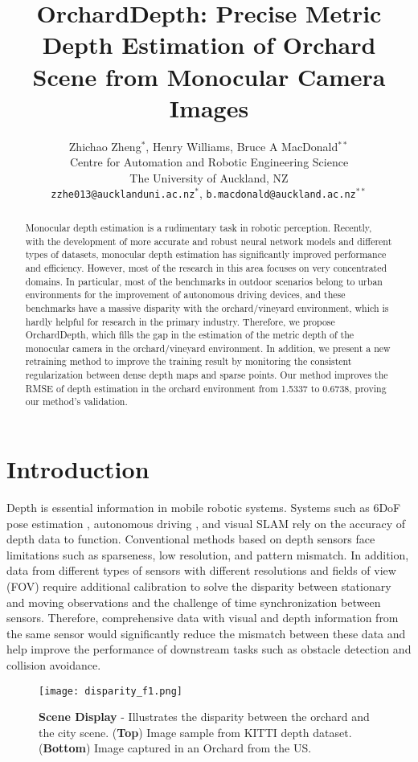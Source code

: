 \documentclass{article}
\title{OrchardDepth: Precise Metric Depth Estimation of Orchard Scene from Monocular Camera Images}
\author{
  Zhichao Zheng$^*$, Henry Williams,  Bruce A MacDonald$^{**}$\\
  Centre for Automation and Robotic Engineering Science\\
  The University of Auckland, NZ\\
  \texttt{zzhe013@aucklanduni.ac.nz}$^*$, \texttt{b.macdonald@auckland.ac.nz}$^{**}$ \\
}
\begin{document}
\maketitle
\begin{abstract}
    Monocular depth estimation is a rudimentary task in robotic perception. Recently, with the development of more accurate and robust neural network models and different types of datasets, monocular depth estimation has significantly improved performance and efficiency. However, most of the research in this area focuses on very concentrated domains. In particular, most of the benchmarks in outdoor scenarios belong to urban environments for the improvement of autonomous driving devices, and these benchmarks have a massive disparity with the orchard/vineyard environment, which is hardly helpful for research in the primary industry. Therefore, we propose OrchardDepth, which fills the gap in the estimation of the metric depth of the monocular camera in the orchard/vineyard environment. In addition, we present a new retraining method to improve the training result by monitoring the consistent regularization between dense depth maps and sparse points. Our method improves the RMSE of depth estimation in the orchard environment from 1.5337 to 0.6738, proving our method's validation.
\end{abstract}

\section{Introduction}
    Depth is essential information in mobile robotic systems. Systems such as 6DoF pose estimation \cite{li2023depth,bundlesdfwen2023}, autonomous driving \cite{xue2020toward,cheng2024adaptive}, and visual SLAM \cite{zhu2020camvox,davison2007monoslam} rely on the accuracy of depth data to function. Conventional methods based on depth sensors face limitations such as sparseness, low resolution, and pattern mismatch. In addition, data from different types of sensors with different resolutions and fields of view (FOV) require additional calibration to solve the disparity between stationary and moving observations and the challenge of time synchronization between sensors. Therefore, comprehensive data with visual and depth information from the same sensor would significantly reduce the mismatch between these data and help improve the performance of downstream tasks such as obstacle detection and collision avoidance. 
    
    \begin{figure}[h]
        \centering
        \texttt{[image: disparity\_f1.png]}
        \caption{\textbf{Scene Display} - Illustrates the disparity between the orchard and the city scene. (\textbf{Top}) Image sample from KITTI depth dataset. (\textbf{Bottom}) Image captured in an Orchard from the US.}
        \label{fig:Scene Display}
    \end{figure}
    
\end{document}
